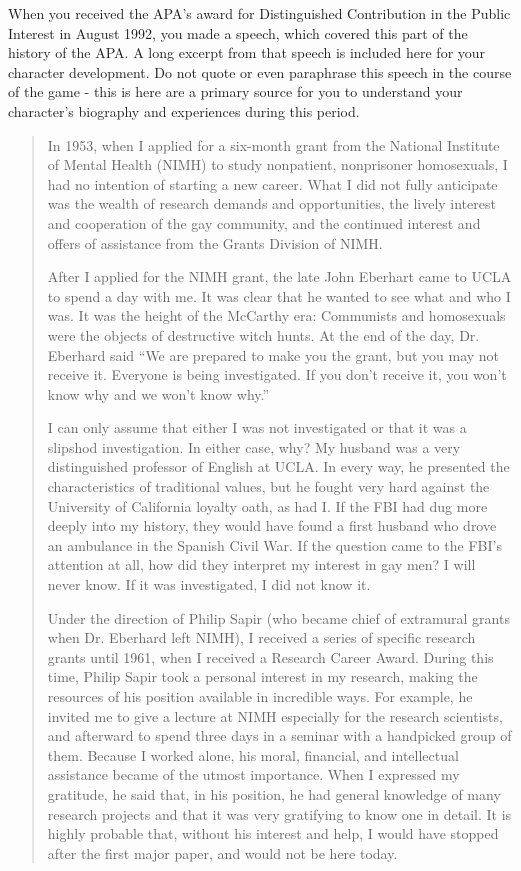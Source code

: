 \begin{refsection}
When you received the APA's award for Distinguished Contribution in the Public Interest in August 1992, you made a speech, which covered this part of the history of the APA. A long excerpt from that speech is included here for your character development. Do not quote or even paraphrase this speech in the course of the game - this is here are a primary source for you to understand your character's biography and experiences during this period.

\begin{quote}

In 1953, when I applied for a six-month grant from the National Institute of Mental Health (NIMH) to study nonpatient, nonprisoner homosexuals, I had no intention of starting a new career. What I did not fully anticipate was the wealth of research demands and opportunities, the lively interest and cooperation of the gay community, and the continued interest and offers of assistance from the Grants Division of NIMH.

After I applied for the NIMH grant, the late John Eberhart came to UCLA to spend a day with me. It was clear that he wanted to see what and who I was. It was the height of the McCarthy era: Communists and homosexuals were the objects of destructive witch hunts. At the end of the day, Dr. Eberhard said ``We are prepared to make you the grant, but you may not receive it. Everyone is being investigated. If you don't receive it, you won't know why and we won't know why.''

I can only assume that either I was not investigated or that it was a slipshod investigation. In either case, why? My husband was a very distinguished professor of English at UCLA. In every way, he presented the characteristics of traditional values, but he fought very hard against the University of California loyalty oath, as had I. If the FBI had dug more deeply into my history, they would have found a first husband who drove an ambulance in the Spanish Civil War. If the question came to the FBI's attention at all, how did they interpret my interest in gay men? I will never know. If it was investigated, I did not know it.

Under the direction of Philip Sapir (who became chief of extramural grants when Dr. Eberhard left NIMH), I received a series of specific research grants until 1961, when I received a Research Career Award. During this time, Philip Sapir took a personal interest in my research, making the resources of his position available in incredible ways. For example, he invited me to give a lecture at NIMH especially for the research scientists, and afterward to spend three days in a seminar with a handpicked group of them. Because I worked alone, his moral, financial, and intellectual assistance became of the utmost importance. When I expressed my gratitude, he said that, in his position, he had general knowledge of many research projects and that it was very gratifying to know one in detail. It is highly probable that, without his interest and help, I would have stopped after the first major paper, and would not be here today.


\end{quote}
\end{refsection}
